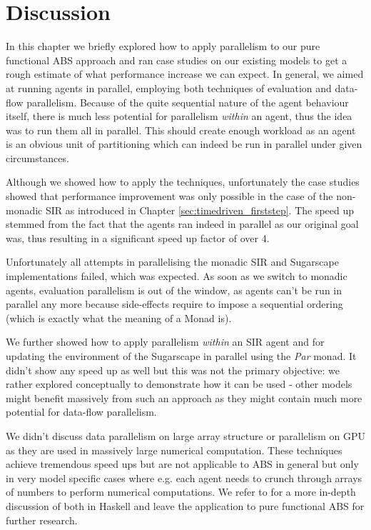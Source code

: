 \section{Discussion}
In this chapter we briefly explored how to apply parallelism to our pure functional ABS approach and ran case studies on our existing models to get a rough estimate of what performance increase we can expect. In general, we aimed at running agents in parallel, employing both techniques of evaluation and data-flow parallelism. Because of the quite sequential nature of the agent behaviour itself, there is much less potential for parallelism \textit{within} an agent, thus the idea was to run them all in parallel. This should create enough workload as an agent is an obvious unit of partitioning which can indeed be run in parallel under given circumstances.

Although we showed how to apply the techniques, unfortunately the case studies showed that performance improvement was only possible in the case of the non-monadic SIR as introduced in Chapter \ref{sec:timedriven_firststep}. The speed up stemmed from the fact that the agents ran indeed in parallel as our original goal was, thus resulting in a significant speed up factor of over 4. 

Unfortunately all attempts in parallelising the monadic SIR and Sugarscape implementations failed, which was expected. As soon as we switch to monadic agents, evaluation parallelism is out of the window, as agents can't be run in parallel any more because side-effects require to impose a sequential ordering (which is exactly what the meaning of a Monad is).

We further showed how to apply parallelism \textit{within} an SIR agent and for updating the environment of the Sugarscape in parallel using the \textit{Par} monad. It didn't show any speed up as well but this was not the primary objective: we rather explored conceptually to demonstrate how it can be used - other models might benefit massively from such an approach as they might contain much more potential for data-flow parallelism.

We didn't discuss data parallelism on large array structure or parallelism on GPU as they are used in massively large numerical computation. These techniques achieve tremendous speed ups but are not applicable to ABS in general but only in very model specific cases where e.g. each agent needs to crunch through arrays of numbers to perform numerical computations. We refer to \cite{marlow_parallel_2013} for a more in-depth discussion of both in Haskell and leave the application to pure functional ABS for further research.

